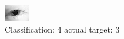 \begin{figure}[h!]
\begin{center}
\includegraphics[width=0.60\columnwidth]{figures/ID143_class_4_target_3.png}
\end{center}
\caption{ Classification: 4 actual target: 3}
\label{fig:ID143_class_4_target_3}
\end{figure}
